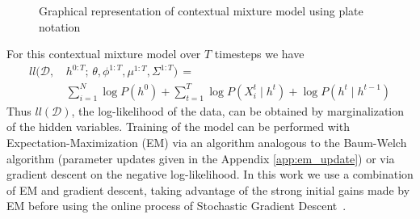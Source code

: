 \documentclass{edm_template}
\begin{document}
\begin{figure}
    \centering
	
	\caption{\label{fig:contextual_mixture_model} Graphical representation of contextual mixture model using plate notation}
\end{figure}

For this contextual mixture model over $T$ timesteps we have
\begin{align*}
ll(\mathcal{D}, \, &h^{0:T} ; \, \theta,\phi^{1:T},\mu^{1:T},\Sigma^{1:T}) \, = \\
&\sum_{i=1}^N \log P(h^0) + \sum_{t=1}^T \log P(X^t_i \mid h^t) + \log P(h^t \mid h^{t-1})
\end{align*}
Thus $ll(\mathcal{D})$, the log-likelihood of the data, can be obtained by marginalization of the hidden variables. Training of the model can be performed with Expectation-Maximization (EM) \cite{dempster1977maximum} via an algorithm analogous to the Baum-Welch algorithm \cite{baum1966statistical} (parameter updates given in the Appendix \ref{app:em_update}) or via gradient descent on the negative log-likelihood. In this work we use a combination of EM and gradient descent, taking advantage of the strong initial gains made by EM before using the online process of Stochastic Gradient Descent~\cite{bottou2010large}. 
\end{document}
